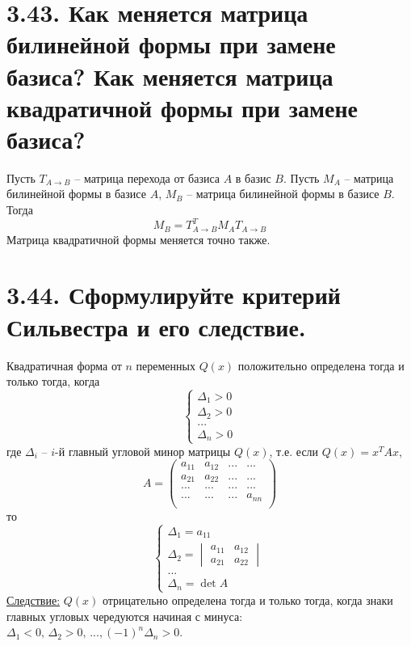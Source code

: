 \documentclass{article}
\begin{document}
\section*{\LARGE 3.43. Как меняется матрица билинейной формы при замене базиса? Как меняется матрица квадратичной формы при замене базиса?}
Пусть $T_{A \rightarrow B}$ -- матрица перехода от базиса $A$ в базис $B$. Пусть $M_A$ -- матрица билинейной формы в базисе $A$, $M_B$ -- матрица билинейной формы в базисе $B$. Тогда 
$$
M_B = T_{A \rightarrow B}^T M_A T_{A \rightarrow B}
$$
Матрица квадратичной формы меняется точно также.

\section*{\LARGE 3.44. Сформулируйте критерий Сильвестра и его следствие.}
Квадратичная форма от $n$ переменных $Q(x)$ положительно определена тогда и только тогда, когда 
$$
\begin{cases}
\Delta_1 > 0 \\
\Delta_2 > 0 \\ 
...\\
\Delta_n > 0
\end{cases}
$$
где $\Delta_i$ -- $i$-й главный угловой минор матрицы $Q(x)$, т.е. если $Q(x) = x^T A x$, 
$$
A = 
\begin{pmatrix}
a_{11} & a_{12} & ... & ... \\
a_{21} & a_{22} & ... & ... \\
... & ... & ... & ... \\
... & ... & ... & a_{nn} \\
\end{pmatrix}
$$
то
$$
\begin{cases}
\Delta_1 = a_{11} \\
\Delta_2 = \begin{vmatrix} a_{11} & a_{12} \\ a_{21} & a_{22} \end{vmatrix} \\ 
...\\
\Delta_n = \det{A}
\end{cases}
$$
\underline{Следствие:}
\newline $Q(x)$ отрицательно определена тогда и только тогда, когда знаки главных угловых чередуются начиная с минуса: $\Delta_1 < 0,\,\Delta_2 > 0,\,..., (-1)^n\Delta_n > 0$.

\end{document}
